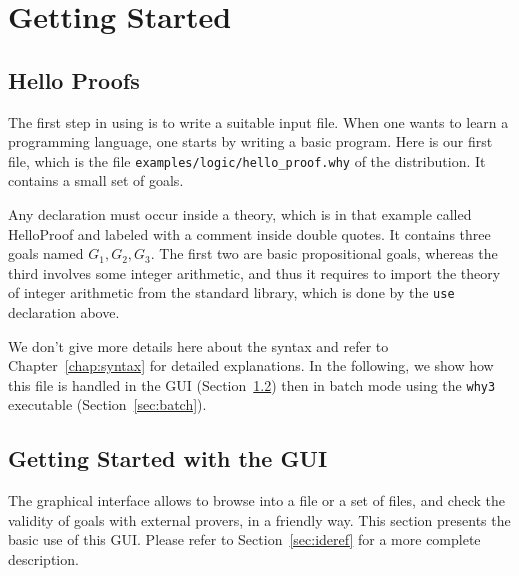 \chapter{Getting Started}
\label{chap:starting}

\section{Hello Proofs}

The first step in using \why is to write a suitable input
file. When one wants to learn a programming language, one starts by
writing a basic program. Here is our first \why file, which is the file
\texttt{examples/logic/hello\_proof.why} of the distribution.
It contains a small set of goals.


Any declaration must occur
inside a theory, which is in that example called HelloProof and
labeled with a comment inside double quotes. It contains three goals
named $G_1,G_2,G_3$. The first two are basic propositional goals,
whereas the third involves some integer arithmetic, and thus it
requires to import the theory of integer arithmetic from the \why
standard library, which is done by the \texttt{use} declaration above.

We don't give more details here about the syntax and refer to
Chapter~\ref{chap:syntax} for detailed explanations. In the following,
we show how this file is handled in the \why GUI
(Section~\ref{sec:gui}) then in batch mode using the \texttt{why3}
executable (Section~\ref{sec:batch}).


\section{Getting Started with the GUI}
\label{sec:gui}

The graphical interface allows to browse into a file or a set of
files, and check the validity of goals with external provers, in a
friendly way. This section presents the basic use of this GUI. Please
refer to Section~\ref{sec:ideref} for a more complete description.

